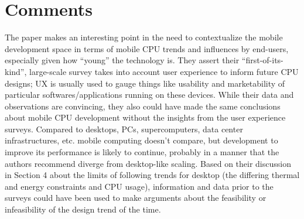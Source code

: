 \documentclass [12pt]{article}
\begin{document}
    \section{Comments} %
    \label{sec:comments}

        The paper makes an interesting point in the need to contextualize the mobile development space in terms of mobile CPU trends and influences by end-users, especially given how ``young'' the technology is. They assert their ``first-of-its-kind'', large-scale survey takes into account user experience to inform future CPU designs; UX is usually used to gauge things like usability and marketability of particular softwares/applications running on these devices. While their data and observations are convincing, they also could have made the same conclusions about mobile CPU development without the insights from the user experience surveys. Compared to desktops, PCs, supercomputers, data center infrastructures, etc. mobile computing doesn't compare, but development to improve its performance is likely to continue, probably in a manner that the authors recommend diverge from desktop-like scaling. Based on their discussion in Section 4 about the limits of following trends for desktop (the differing thermal and energy constraints and CPU usage), information and data prior to the surveys could have been used to make arguments about the feasibility or infeasibility of the design trend of the time. 
        
        
\end{document}
